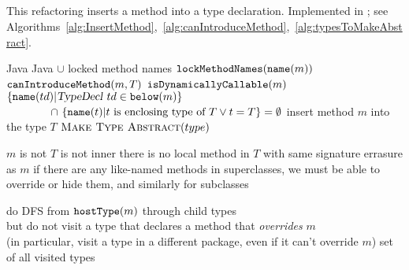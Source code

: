 \subsection{}
This refactoring inserts a method into a type declaration. Implemented in ; see Algorithms~\ref{alg:InsertMethod},~\ref{alg:canIntroduceMethod},~\ref{alg:typesToMakeAbstract}.

\begin{algorithm}[p]
\caption{$\refactoring{Insert Method}(m : \type{Method}, T : \type{Type})$}\label{alg:InsertMethod}
\begin{algorithmic}[1]
\REQUIRE Java
\ENSURE Java $\cup$ locked method names
\medskip
  \STATE $\text{\texttt{lockMethodNames}}(\text{\texttt{name}}(m))$
  \STATE \assert $\text{\texttt{canIntroduceMethod}}(m, T)$
  \STATE \assert \NOT $\text{\texttt{isDynamicallyCallable}}(m)$ %
  \STATE \assert $\{\util{name}(td) | \type{TypeDecl}\ td\in\util{below}(m)\} 
  		$\\$\qquad\qquad\cap\  
		\{\text{\texttt{name}}(t) | t\text{ is enclosing type of }T \vee t = T\} = \emptyset$
  \STATE insert method $m$ into the type $T$
       \STATE $\textsc{Make Type Abstract}(type)$
     \ENDFOR
  \ENDIF
\end{algorithmic}
\end{algorithm}


\begin{algorithm}[p]
\caption{$\util{canIntroduceMethod}(m : \type{Method}, T : \type{Type})$}\label{alg:canIntroduceMethod}
\begin{algorithmic}[1]
  \STATE \assert $m$ is not  \OR $T$ is not inner
  \STATE \assert there is no local method in $T$ with same signature errasure as $m$
  \STATE \assert if there are any like-named methods in superclasses, we must be able to override or hide them, and
  			similarly for subclasses
\end{algorithmic}
\end{algorithm}

\begin{algorithm}[p]
\caption{$\util{typesToMakeAbstract}(m : \type{Method}) : \settp{Type}$}\label{alg:typesToMakeAbstract}
\begin{algorithmic}[1]
  \STATE do DFS from $\text{\texttt{hostType}}(m)$ through child types \\
    but do not visit a type that declares a method that \emph{overrides} $m$ \\
    (in particular, visit a type in a different package, even if it can't override $m$)
  \RETURN set of all visited types
\end{algorithmic}
\end{algorithm}

